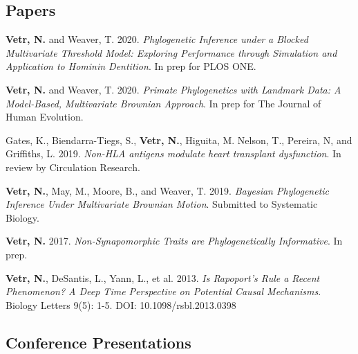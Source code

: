 \documentclass[12pt]{article}
\begin{document}
\subsection{Papers}

\begin{enumerate}[label={[\arabic*]}]

\item \textbf{Vetr, N.} and Weaver, T. 2020.  \emph{Phylogenetic Inference under a Blocked Multivariate Threshold Model: Exploring Performance through Simulation and Application to Hominin Dentition}. In prep for PLOS ONE.

\item \textbf{Vetr, N.} and Weaver, T. 2020.  \emph{Primate Phylogenetics with Landmark Data: A Model-Based, Multivariate Brownian Approach}. In prep for The Journal of Human Evolution.

\item Gates, K., Biendarra-Tiegs, S., \textbf{Vetr, N.}, Higuita, M. Nelson, T., Pereira, N, and Griffiths, L. 2019.  \emph{Non-HLA antigens modulate heart transplant dysfunction}. In review by Circulation Research.

\item \textbf{Vetr, N.}, May, M., Moore, B., and Weaver, T. 2019.  \emph{Bayesian Phylogenetic Inference Under Multivariate Brownian Motion}. Submitted to Systematic Biology.

\item \textbf{Vetr, N.} 2017.  \emph{Non-Synapomorphic Traits are Phylogenetically Informative}. In prep.

\item \textbf{Vetr, N.}, DeSantis, L., Yann, L., et al. 2013.  \emph{Is Rapoport’s Rule a Recent Phenomenon? A Deep Time Perspective on Potential Causal Mechanisms}. Biology Letters 9(5): 1-5. DOI: 10.1098/rsbl.2013.0398


\end{enumerate}


\subsection{Conference Presentations}
\end{document}
